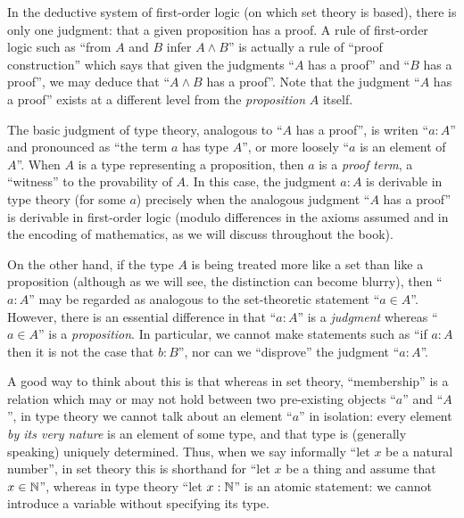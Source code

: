 In the deductive system of first-order logic (on which set theory is based), there is only one judgment: that a given proposition has a proof.
A rule of first-order logic such as ``from $A$ and $B$ infer $A\wedge B$'' is actually a rule of ``proof construction'' which says that given the judgments ``$A$ has a proof'' and ``$B$ has a proof'', we may deduce that ``$A\wedge B$ has a proof''.
Note that the judgment ``$A$ has a proof'' exists at a different level from the \emph{proposition} $A$ itself.

The basic judgment of type theory, analogous to ``$A$ has a proof'', is writen ``$a:A$'' and pronounced as ``the term $a$ has type $A$'', or more loosely ``$a$ is an element of $A$''.
When $A$ is a type representing a proposition, then $a$ is a \emph{proof term}, a ``witness'' to the provability of $A$.
In this case, the judgment $a:A$ is derivable in type theory (for some $a$) precisely when the analogous judgment ``$A$ has a proof'' is derivable in first-order logic (modulo differences in the axioms assumed and in the encoding of mathematics, as we will discuss throughout the book).

On the other hand, if the type $A$ is being treated more like a set than like a proposition (although as we will see, the distinction can become blurry), then ``$a:A$'' may be regarded as analogous to the set-theoretic statement ``$a\in A$''.
However, there is an essential difference in that ``$a:A$'' is a \emph{judgment} whereas ``$a\in A$'' is a \emph{proposition}.
In particular, we cannot make statements such as ``if $a:A$ then it is not the case that $b:B$'', nor can we ``disprove'' the judgment ``$a:A$''.

A good way to think about this is that whereas in set theory, ``membership'' is a relation which may or may not hold between two pre-existing objects ``$a$'' and ``$A$'', in type theory we cannot talk about an element ``$a$'' in isolation: every element \emph{by its very nature} is an element of some type, and that type is (generally speaking) uniquely determined.
Thus, when we say informally ``let $x$ be a natural number'', in set theory this is shorthand for ``let $x$ be a thing and assume that $x\in\mathbb{N}$'', whereas in type theory ``let $x:\mathbb{N}$'' is an atomic statement: we cannot introduce a variable without specifying its type.

